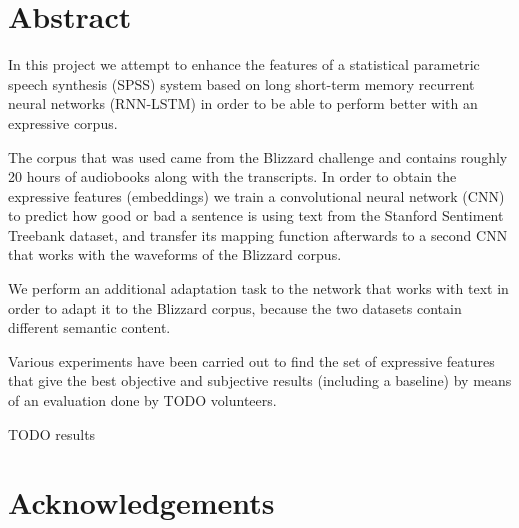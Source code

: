 \chapter*{Abstract}

In this project we attempt to enhance the features of a statistical parametric speech synthesis (SPSS) system based on long short-term memory recurrent neural networks (RNN-LSTM) in order to be able to perform better with an expressive corpus.

The corpus that was used came from the Blizzard challenge \cite{blizzard} and contains roughly 20 hours of audiobooks along with the transcripts. In order to obtain the expressive features (embeddings) we train a convolutional neural network (CNN) to predict how good or bad a sentence is using text from the Stanford Sentiment Treebank \cite{socher2013recursive} dataset, and transfer its mapping function afterwards to a second CNN that works with the waveforms of the Blizzard corpus.

We perform an additional adaptation task to the network that works with text in order to adapt it to the Blizzard corpus, because the two datasets contain different semantic content.

Various experiments have been carried out to find the set of expressive features that give the best objective and subjective results (including a baseline) by means of an evaluation done by TODO volunteers.

TODO results



\chapter*{Acknowledgements}
